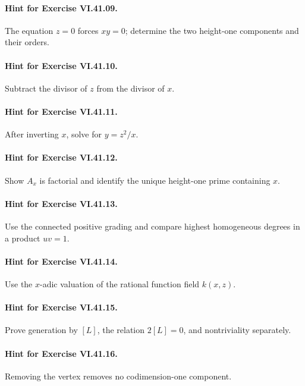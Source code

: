 \paragraph{Hint for Exercise VI.41.09.}
The equation \(z=0\) forces \(xy=0\); determine the two height-one components and their orders.

\paragraph{Hint for Exercise VI.41.10.}
Subtract the divisor of \(z\) from the divisor of \(x\).

\paragraph{Hint for Exercise VI.41.11.}
After inverting \(x\), solve for \(y=z^2/x\).

\paragraph{Hint for Exercise VI.41.12.}
Show \(A_x\) is factorial and identify the unique height-one prime containing \(x\).

\paragraph{Hint for Exercise VI.41.13.}
Use the connected positive grading and compare highest homogeneous degrees in a product \(uv=1\).

\paragraph{Hint for Exercise VI.41.14.}
Use the \(x\)-adic valuation of the rational function field \(k(x,z)\).

\paragraph{Hint for Exercise VI.41.15.}
Prove generation by \([L]\), the relation \(2[L]=0\), and nontriviality separately.

\paragraph{Hint for Exercise VI.41.16.}
Removing the vertex removes no codimension-one component.

